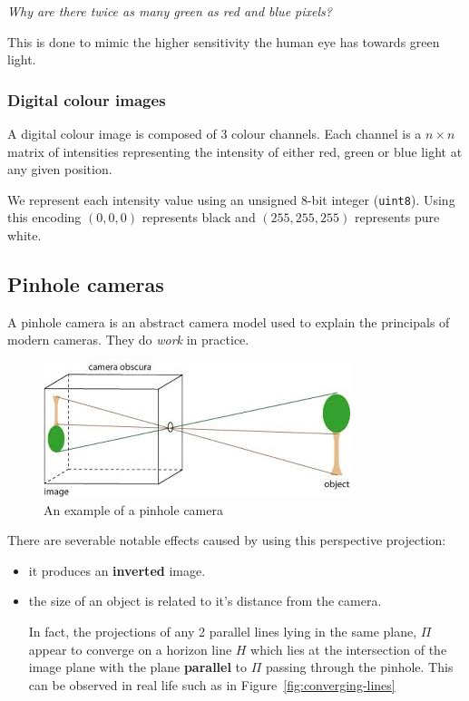 \documentclass{article}
\begin{document}
\textit{Why are there twice as many green as red and blue pixels?}

This is done to mimic the higher sensitivity the human eye has towards green light.

\subsubsection{Digital colour images}

A digital colour image is composed of 3 colour channels. Each channel is a $n\times n$ matrix of intensities representing the intensity of either red, green or blue light at any given position.

We represent each intensity value using an unsigned 8-bit integer (\texttt{uint8}). Using this encoding $(0,0,0)$ represents black and $(255,255,255)$ represents pure white.


\subsection{Pinhole cameras}
\label{subsec:pinhole}

A pinhole camera is an abstract camera model used to explain the principals of modern cameras. They do \textit{work} in practice.

\begin{figure}[ht]
  \centering
  \includegraphics[scale=0.4]{figures/pinholecamera.jpg}
  \caption{\label{fig:pinhole-camera} An example of a pinhole camera}
\end{figure}

There are severable notable effects caused by using this perspective projection:

\begin{itemize}
  \item it produces an \textbf{inverted} image.
  \item the size of an object is related to it's distance from the camera.

        In fact, the projections of any 2 parallel lines lying in the same plane, $\Pi$ appear to converge on a horizon line $H$ which lies at the intersection of the image plane with the plane \textbf{parallel} to $\Pi$ passing through the pinhole. This can be observed in real life such as in Figure~\ref{fig:converging-lines}

\end{itemize}
\end{document}

